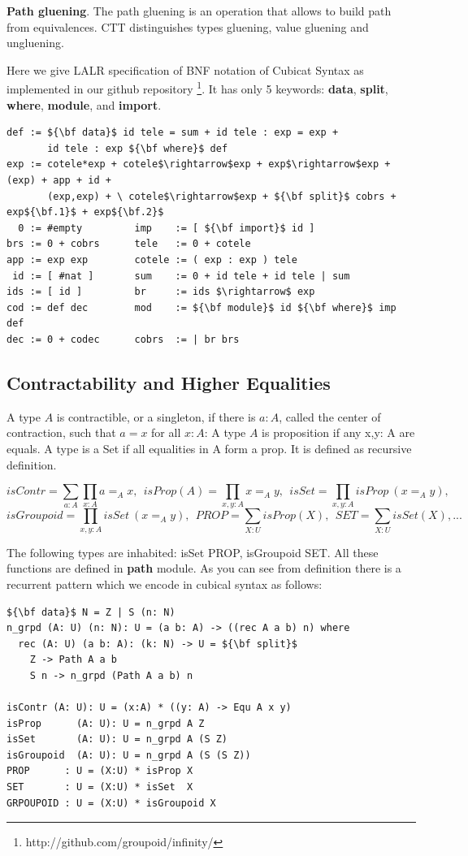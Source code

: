\documentclass{article}
\begin{document}
{\bf Path gluening}. The path gluening is an operation that allows to build
path from equivalences. CTT distinguishes types gluening, value gluening and ungluening.

Here we give LALR specification of BNF notation of Cubicat Syntax as implemented
in our github repository \footnote{http://github.com/groupoid/infinity/}. It has
only 5 keywords: {\bf data}, {\bf split}, {\bf where}, {\bf module}, and {\bf import}.

\begin{lstlisting}[mathescape=true]
def := ${\bf data}$ id tele = sum + id tele : exp = exp +
       id tele : exp ${\bf where}$ def
exp := cotele*exp + cotele$\rightarrow$exp + exp$\rightarrow$exp + (exp) + app + id +
       (exp,exp) + \ cotele$\rightarrow$exp + ${\bf split}$ cobrs + exp${\bf.1}$ + exp${\bf.2}$
  0 := #empty         imp    := [ ${\bf import}$ id ]
brs := 0 + cobrs      tele   := 0 + cotele
app := exp exp        cotele := ( exp : exp ) tele
 id := [ #nat ]       sum    := 0 + id tele + id tele | sum
ids := [ id ]         br     := ids $\rightarrow$ exp
cod := def dec        mod    := ${\bf module}$ id ${\bf where}$ imp def
dec := 0 + codec      cobrs  := | br brs
\end{lstlisting}

\subsection{Contractability and Higher Equalities}

A type $A$ is contractible, or a singleton, if there is $a : A$,
called the center of contraction, such that $a = x$ for all $x : A$:
A type $A$ is proposition if any x,y: A are equals.
A type is a Set if all equalities in A form a prop.
It is defined as recursive definition.

$$isContr = \sum_{a:A}\prod_{x:A} a =_A x,\ \ 
  isProp(A) = \prod_{x,y:A} x =_A y,\ \ 
  isSet = \prod_{x,y:A} isProp\ (x =_A y),\ \ $$
$$isGroupoid = \prod_{x,y:A} isSet\ (x =_A y),\ \ 
  PROP = \sum_{X:U}isProp(X),\ \ 
  SET = \sum_{X:U}isSet(X),...$$

The following types are inhabited: isSet PROP, isGroupoid SET.
All these functions are defined in {\bf path} module. As you can see
from definition there is a recurrent pattern which we encode in cubical syntax
as follows:

\begin{lstlisting}[mathescape=true]
${\bf data}$ N = Z | S (n: N)
n_grpd (A: U) (n: N): U = (a b: A) -> ((rec A a b) n) where
  rec (A: U) (a b: A): (k: N) -> U = ${\bf split}$
    Z -> Path A a b
    S n -> n_grpd (Path A a b) n

isContr (A: U): U = (x:A) * ((y: A) -> Equ A x y)
isProp      (A: U): U = n_grpd A Z
isSet       (A: U): U = n_grpd A (S Z)
isGroupoid  (A: U): U = n_grpd A (S (S Z))
PROP      : U = (X:U) * isProp X
SET       : U = (X:U) * isSet  X
GRPOUPOID : U = (X:U) * isGroupoid X
\end{lstlisting}
\end{document}
